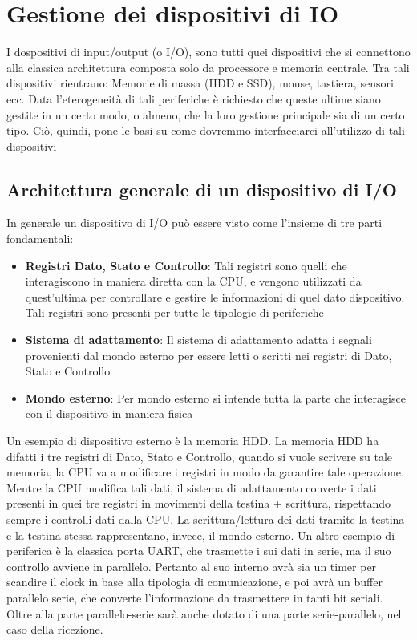\chapter{Gestione dei dispositivi di IO}
I dospositivi di input/output (o I/O), sono tutti quei dispositivi che si connettono alla classica architettura composta solo da processore e memoria centrale. Tra tali dispositivi rientrano: Memorie di massa (HDD e SSD), mouse, tastiera, sensori ecc.
Data l'eterogeneità di tali periferiche è richiesto che queste ultime siano gestite in un certo modo, o almeno, che la loro gestione principale sia di un certo tipo. Ciò, quindi, pone le basi su come dovremmo interfacciarci all'utilizzo di tali dispositivi

\section{Architettura generale di un dispositivo di I/O}
In generale un dispositivo di I/O può essere visto come l'insieme di tre parti fondamentali:
\begin{itemize}
    \item \textbf{Registri Dato, Stato e Controllo}: Tali registri sono quelli che interagiscono in maniera diretta con la CPU, e vengono utilizzati da quest'ultima per controllare e gestire le informazioni di quel dato dispositivo. Tali registri sono presenti per tutte le tipologie di periferiche
    
    \item \textbf{Sistema di adattamento}: Il sistema di adattamento adatta i segnali provenienti dal mondo esterno per essere letti o scritti nei registri di Dato, Stato e Controllo
    
    \item \textbf{Mondo esterno}: Per mondo esterno si intende tutta la parte che interagisce con il dispositivo in maniera fisica
\end{itemize}

Un esempio di dispositivo esterno è la memoria HDD.
La memoria HDD ha difatti i tre registri di Dato, Stato e Controllo, quando si vuole scrivere su tale memoria, la CPU va a modificare i registri in modo da garantire tale operazione. Mentre la CPU modifica tali dati, il sistema di adattamento converte i dati presenti in quei tre registri in movimenti della testina + scrittura, rispettando sempre i controlli dati dalla CPU. La scrittura/lettura dei dati tramite la testina e la testina stessa rappresentano, invece, il mondo esterno.
Un altro esempio di periferica è la classica porta UART, che trasmette i sui dati in serie, ma il suo controllo avviene in parallelo. Pertanto al suo interno avrà sia un timer per scandire il clock in base alla tipologia di comunicazione, e poi avrà un buffer parallelo serie, che converte l'informazione da trasmettere in tanti bit seriali. Oltre alla parte parallelo-serie sarà anche dotato di una parte serie-parallelo, nel caso della ricezione.


